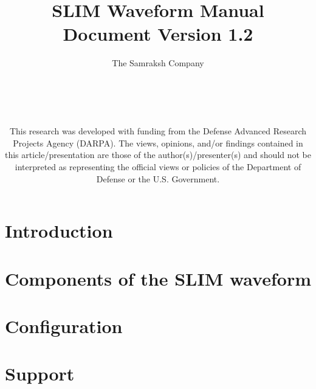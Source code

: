 \documentclass[letterpaper,
 11pt,
 titlepage,
 pdftex,
 twoside=false,
 openany,			%
 headinclude,    %
 appendixprefix=true,
 chapterprefix=false,   
 index= totoc,        %
 bibliography=openstyle,
 bibliography    = totoc         %
]{scrbook}
\begin{document}
\begin{titlepage}
\title{
{\Huge SLIM Waveform Manual}\\
Document Version 1.2 \\
}
\author{The Samraksh Company\\
\\
\\
\\
\\}
\date{This research was developed with funding from the Defense Advanced Research Projects Agency (DARPA). The views, opinions, and/or findings contained in this article/presentation are those of the author(s)/presenter(s) and should not be interpreted as representing the official views or policies of the Department of Defense or the U.S. Government.}

\end{titlepage}

\maketitle
\tableofcontents{}


\chapter {Introduction}
\label{Chap:Intro}


\chapter{Components of the SLIM waveform}
\label{Chap:MAC}


\chapter {Configuration}
\label{Chap:Config}


%

\chapter{Support}
\label{Chap:Support}








\end{document}
